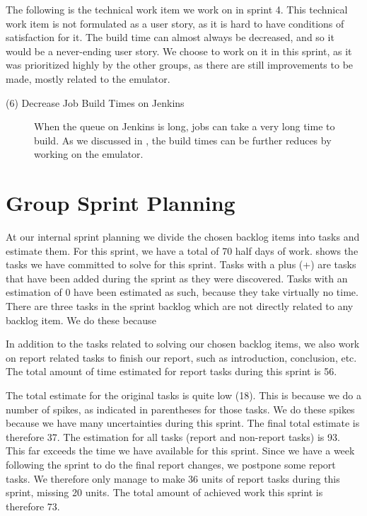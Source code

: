 The following is the technical work item we work on in sprint 4. This technical work item is not formulated as a user story, as it is hard to have conditions of satisfaction for it. The build time can almost always be decreased, and so it would be a never-ending user story. We choose to work on it in this sprint, as it was prioritized highly by the other groups, as there are still improvements to be made, mostly related to the emulator.

\begin{description}
  \item[(6) Decrease Job Build Times on Jenkins] When the queue on Jenkins is long, jobs can take a very long time to build. As we discussed in , the build times can be further reduces by working on the emulator.
\end{description}

\section{Group Sprint Planning}\label{sec:S4_group}
At our internal sprint planning we divide the chosen backlog items into tasks and estimate them. For this sprint, we have a total of 70 half days of work.  shows the tasks we have committed to solve for this sprint. Tasks with a plus (+) are tasks that have been added during the sprint as they were discovered. Tasks with an estimation of 0 have been estimated as such, because they take virtually no time. There are three tasks in the sprint backlog which are not directly related to any backlog item. We do these because 

In addition to the tasks related to solving our chosen backlog items, we also work on report related tasks to finish our report, such as introduction, conclusion, etc. The total amount of time estimated for report tasks during this sprint is 56.

The total estimate for the original tasks is quite low (18). This is because we do a number of spikes, as indicated in parentheses for those tasks. We do these spikes because we have many uncertainties during this sprint. The final total estimate is therefore 37. The estimation for all tasks (report and non-report tasks) is 93. This far exceeds the time we have available for this sprint. Since we have a week following the sprint to do the final report changes, we postpone some report tasks. We therefore only manage to make 36 units of report tasks during this sprint, missing 20 units. The total amount of achieved work this sprint is therefore 73.

